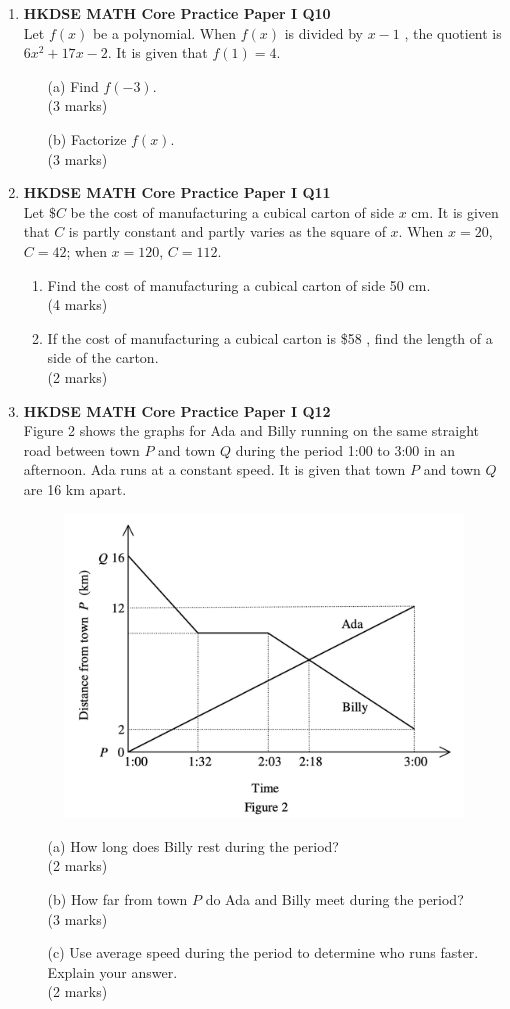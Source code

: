 \documentclass[12pt]{article}
\begin{document}
\begin{enumerate}
	\item \textbf{HKDSE MATH Core Practice Paper I Q10}\\
	Let $f(x)$ be a polynomial. When $f(x)$ is divided by $x - 1$ , the quotient is $6x^2 + 17x - 2$. It is given that $f(1) = 4$.
	\begin{enumerate}
		\item[(a)] Find $f(-3)$. \\(3 marks)
		\item[(b)] Factorize $f(x)$. \\(3 marks)
	\end{enumerate} 

	\item \textbf{HKDSE MATH Core Practice Paper I Q11}\\
	Let $\$ C$ be the cost of manufacturing a cubical carton of side $x$ cm. It is given that $C$ is partly constant and partly varies as the square of $x$. When $x = 20$, $C = 42$; when $x = 120$, $C = 112$.
	\begin{enumerate}
		\item Find the cost of manufacturing a cubical carton of side 50 cm. \\(4 marks)
		\item If the cost of manufacturing a cubical carton is \$58 , find the length of a side of the carton. \\(2 marks)
	\end{enumerate}

	\item \textbf{HKDSE MATH Core Practice Paper I Q12}\\
	Figure 2 shows the graphs for Ada and Billy running on the same straight road between town $P$ and town $Q$ during the period 1:00 to 3:00 in an afternoon. Ada runs at a constant speed. It is given that town $P$ and town $Q$ are 16 km apart.
	\begin{figure}[H]
		\centering
		\includegraphics[width = .5\linewidth]{PPFigure1.2}
	\end{figure}
	\begin{enumerate}
		\item[(a)] How long does Billy rest during the period? \\(2 marks)
		\item[(b)] How far from town $P$ do Ada and Billy meet during the period? \\(3 marks)
		\item[(c)] Use average speed during the period to determine who runs faster. Explain your answer. \\(2 marks)
	\end{enumerate}


\end{enumerate}
\end{document}
